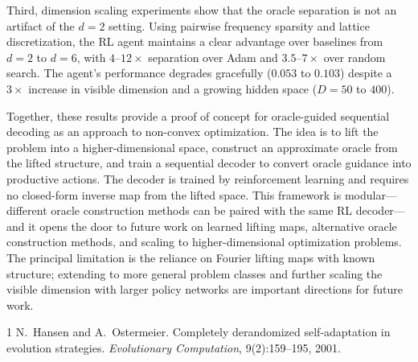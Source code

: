 \documentclass[10pt]{article}
\theoremstyle{definition}
\begin{document}
Third, dimension scaling experiments show that the oracle separation is not an artifact of the $d = 2$ setting. Using pairwise frequency sparsity and lattice discretization, the RL agent maintains a clear advantage over baselines from $d = 2$ to $d = 6$, with $4$--$12\times$ separation over Adam and $3.5$--$7\times$ over random search. The agent's performance degrades gracefully ($0.053$ to $0.103$) despite a $3\times$ increase in visible dimension and a growing hidden space ($D = 50$ to $400$).

Together, these results provide a proof of concept for oracle-guided sequential decoding as an approach to non-convex optimization. The idea is to lift the problem into a higher-dimensional space, construct an approximate oracle from the lifted structure, and train a sequential decoder to convert oracle guidance into productive actions. The decoder is trained by reinforcement learning and requires no closed-form inverse map from the lifted space. This framework is modular---different oracle construction methods can be paired with the same RL decoder---and it opens the door to future work on learned lifting maps, alternative oracle construction methods, and scaling to higher-dimensional optimization problems. The principal limitation is the reliance on Fourier lifting maps with known structure; extending to more general problem classes and further scaling the visible dimension with larger policy networks are important directions for future work.

\begin{thebibliography}{1}
N.~Hansen and A.~Ostermeier.
\newblock Completely derandomized self-adaptation in evolution strategies.
\newblock \emph{Evolutionary Computation}, 9(2):159--195, 2001.
\end{thebibliography}
\end{document}
